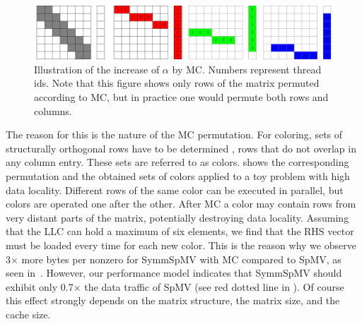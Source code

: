   \begin{figure}[t]
  	\centering
  	\includegraphics[scale=0.45]{pics/mc_alpha_problem/mc_alpha_unsymm}
  	\caption{Illustration of the increase of $\alpha$ by \acrshort{MC}. Numbers represent thread ids. Note that this figure shows only rows of the matrix permuted according to \acrshort{MC}, but in practice one would permute both rows and columns.}
  	\label{fig:mc_alpha}
  \end{figure}
  
The reason for this is the nature of the \acrshort{MC}
permutation. For \DTWO coloring, sets of structurally orthogonal
rows have to be determined \cite{dist_k_def}, \ie rows that do not
overlap in any column entry. These sets are referred to as colors.  shows the corresponding permutation
and the obtained sets of colors applied to a toy problem with high
data locality. Different rows of the same color can be executed in
parallel, but colors are operated one after the
other. After \acrshort{MC} a color may contain rows from very distant
parts of the matrix, potentially destroying data locality.  Assuming
that the \acrshort{LLC} can hold a maximum of six elements, we find
that the RHS vector must be loaded every time for each
new color. This is the reason why we observe 3$\times$ more bytes
per nonzero for \acrshort{SymmSpMV} with \acrshort{MC} compared
to \acrshort{SpMV}, as seen in~.  However,
our performance model indicates that \acrshort{SymmSpMV} should
exhibit only 0.7$\times$ the data traffic of \acrshort{SpMV} (see
red dotted line in ). Of course this
effect strongly depends on the matrix structure, the matrix size, and
the cache size.
        
